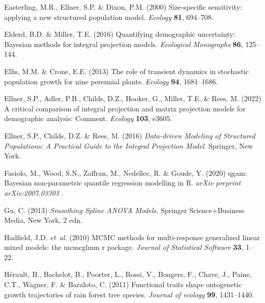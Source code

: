 \documentclass[12pt]{article}
\begin{document}
\begin{spacing}{1.9}
\begin{thebibliography}{62}
Easterling, M.R., Ellner, S.P. \& Dixon, P.M. (2000) Size-specific sensitivity:
  applying a new structured population model. \emph{Ecology} \textbf{81},
  694--708.

Elderd, B.D. \& Miller, T.E. (2016) Quantifying demographic uncertainty:
  {B}ayesian methods for integral projection models. \emph{Ecological
  Monographs} \textbf{86}, 125--144.

Ellis, M.M. \& Crone, E.E. (2013) The role of transient dynamics in stochastic
  population growth for nine perennial plants. \emph{Ecology} \textbf{94},
  1681--1686.

Ellner, S.P., Adler, P.B., Childs, D.Z., Hooker, G., Miller, T.E. \& Rees, M.
  (2022) A critical comparison of integral projection and matrix projection
  models for demographic analysis: Comment. \emph{Ecology} \textbf{103}, e3605.

Ellner, S.P., Childs, D.Z. \& Rees, M. (2016) \emph{Data-driven Modeling of
  Structured Populations: A Practical Guide to the Integral Projection Model}.
  Springer, New York.

Fasiolo, M., Wood, S.N., Zaffran, M., Nedellec, R. \& Goude, Y. (2020) qgam:
  {B}ayesian non-parametric quantile regression modelling in {R}. \emph{arXiv
  preprint arXiv:2007.03303} .

Gu, C. (2013) \emph{Smoothing Spline ANOVA Models}. Springer Science+Business
  Media, New York, 2 edn.

Hadfield, J.D. \emph{et~al.} (2010) {MCMC} methods for multi-response
  generalized linear mixed models: the mcmcglmm r package. \emph{Journal of
  Statistical Software} \textbf{33}, 1--22.

H{\'e}rault, B., Bachelot, B., Poorter, L., Rossi, V., Bongers, F., Chave, J.,
  Paine, C.T., Wagner, F. \& Baraloto, C. (2011) Functional traits shape
  ontogenetic growth trajectories of rain forest tree species. \emph{Journal of
  ecology} \textbf{99}, 1431--1440.


\end{thebibliography}
\end{spacing}
\end{document}
